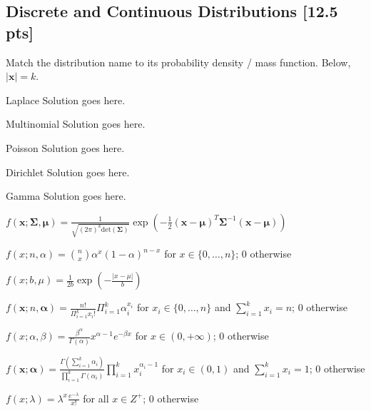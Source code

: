 \documentclass[a4paper]{article}
\theoremstyle{definition}
\newcommand{\vc}[1]{\boldsymbol{#1}}
\newcommand{\Sigmav}{\vc{\Sigma}}
\newcommand{\alphav}{\vc{\alpha}}
\newcommand{\muv}{\vc{\mu}}
\newenvironment{soln}{
    \leavevmode\color{blue}\ignorespaces
}{}
\begin{document}
\subsection{Discrete and Continuous Distributions [12.5 pts]}
Match the distribution name to its probability density / mass
function. Below, $|\mathbf{x}| = k$.
\begin{enumerate}[(a)]
\begin{minipage}{0.3\linewidth}
    \item Laplace \begin{soln}  Solution goes here. \end{soln}
    \item Multinomial \begin{soln}  Solution goes here. \end{soln}
    \item Poisson \begin{soln}  Solution goes here. \end{soln}
    \item Dirichlet \begin{soln}  Solution goes here. \end{soln}
    \item Gamma \begin{soln}  Solution goes here. \end{soln}
\end{minipage}
\begin{minipage}{0.5\linewidth}
    \item $f(\mathbf{x}; \Sigmav, \muv) = \frac{1}{\sqrt{(2\pi)^k \mathrm{det}(\Sigmav) }} \exp\left( -\frac{1}{2}
        (\mathbf{x} - \muv)^T \Sigmav^{-1} (\mathbf{x} - \muv)  \right)$
    \item $f(x; n, \alpha) = \binom{n}{x} \alpha^x (1 - \alpha)^{n-x}$
      for $x \in \{0,\ldots, n\}$; $0$ otherwise
    \item $f(x; b, \mu) = \frac{1}{2b} \exp\left( - \frac{|x - \mu|}{b} \right)$
    \item $f(\mathbf{x}; n, \alphav) = \frac{n!}{\Pi_{i=1}^k x_i!}
      \Pi_{i=1}^k \alpha_i^{x_i}$ for $x_i \in \{0,\ldots,n\}$ and
      $\sum_{i=1}^k x_i = n$; $0$ otherwise
    \item $f(x; \alpha, \beta) = \frac{\beta^{\alpha}}{\Gamma(\alpha)} x^{\alpha -
        1}e^{-\beta x}$ for $x \in (0,+\infty)$; $0$ otherwise
    \item $f(\mathbf{x}; \alphav) = \frac{\Gamma(\sum_{i=1}^k
        \alpha_i)}{\prod_{i=1}^k \Gamma(\alpha_i)} \prod_{i=1}^{k}
      x_i^{\alpha_i - 1}$ for $x_i \in (0,1)$ and $\sum_{i=1}^k x_i =
      1$; 0 otherwise
    \item $f(x; \lambda) = \lambda^x \frac{e^{-\lambda}}{x!}$ for all
      $x \in Z^+$; $0$ otherwise
\end{minipage}
\end{enumerate}
        
\end{document}
